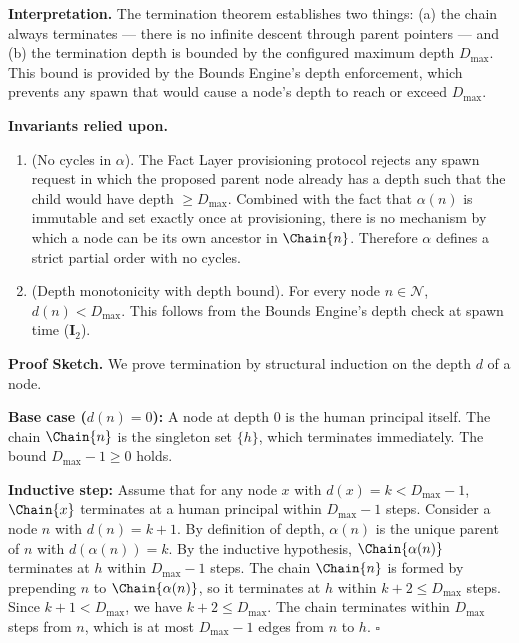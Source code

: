 \bigskip
\noindent\textbf{Interpretation.} The termination theorem establishes two things: (a) the chain always terminates — there is no infinite descent through parent pointers — and (b) the termination depth is bounded by the configured maximum depth $D_{\max}$. This bound is provided by the Bounds Engine's depth enforcement, which prevents any spawn that would cause a node's depth to reach or exceed $D_{\max}$.

\bigskip
\noindent\textbf{Invariants relied upon.}

\begin{enumerate}
\item[$\textbf{I}_5$] (No cycles in $\alpha$). The Fact Layer provisioning protocol rejects any spawn request in which the proposed parent node already has a depth such that the child would have depth $\geq D_{\max}$. Combined with the fact that $\alpha(n)$ is immutable and set exactly once at provisioning, there is no mechanism by which a node can be its own ancestor in $\Chain{n}$. Therefore $\alpha$ defines a strict partial order with no cycles.

\item[$\textbf{I}_6$] (Depth monotonicity with depth bound). For every node $n \in \mathcal{N}$, $d(n) < D_{\max}$. This follows from the Bounds Engine's depth check at spawn time ($\textbf{I}_2$).
\end{enumerate}

\bigskip
\noindent\textbf{Proof Sketch.} We prove termination by structural induction on the depth $d$ of a node.

\textbf{Base case ($d(n) = 0$):} A node at depth 0 is the human principal itself. The chain $\Chain{n}$ is the singleton set $\{h\}$, which terminates immediately. The bound $D_{\max} - 1 \geq 0$ holds.

\textbf{Inductive step:} Assume that for any node $x$ with $d(x) = k < D_{\max} - 1$, $\Chain{x}$ terminates at a human principal within $D_{\max} - 1$ steps. Consider a node $n$ with $d(n) = k + 1$. By definition of depth, $\alpha(n)$ is the unique parent of $n$ with $d(\alpha(n)) = k$. By the inductive hypothesis, $\Chain{\alpha(n)}$ terminates at $h$ within $D_{\max} - 1$ steps. The chain $\Chain{n}$ is formed by prepending $n$ to $\Chain{\alpha(n)}$, so it terminates at $h$ within $k + 2 \leq D_{\max}$ steps. Since $k + 1 < D_{\max}$, we have $k + 2 \leq D_{\max}$. The chain terminates within $D_{\max}$ steps from $n$, which is at most $D_{\max} - 1$ edges from $n$ to $h$. $\square$

